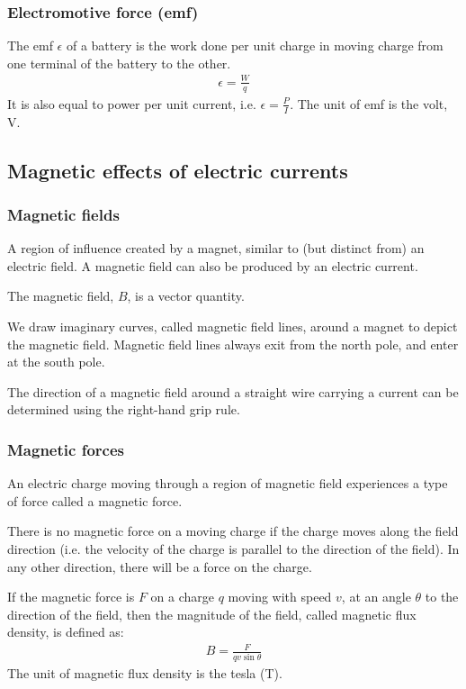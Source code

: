 \subsubsection{Electromotive force (emf)}
\begin{definition}
    The emf $\epsilon$ of a battery is the work done per unit charge in moving
    charge from one terminal of the battery to the other.
    \begin{align*}
        \epsilon = \frac{W}{q}
    \end{align*}
    It is also equal to power per unit current, i.e. $\epsilon = \frac{P}{I}$.
    The unit of emf is the volt, V.
\end{definition}

\subsection{Magnetic effects of electric currents}

\subsubsection{Magnetic fields}
A region of influence created by a magnet, similar to (but distinct from) an
electric field. A magnetic field can also be produced by an electric current.

The magnetic field, $B$, is a vector quantity.

We draw imaginary curves, called magnetic field lines, around a magnet to
depict the magnetic field. Magnetic field lines always exit from the north
pole, and enter at the south pole.

The direction of a magnetic field around a straight wire carrying a current
can be determined using the right-hand grip rule.

\subsubsection{Magnetic forces}
An electric charge moving through a region of magnetic field experiences a type
of force called a magnetic force.

There is no magnetic force on a moving charge if the charge moves along the
field direction (i.e. the velocity of the charge is parallel to the direction
of the field). In any other direction, there will be a force on the charge.

\begin{definition}
    If the magnetic force is $F$ on a charge $q$ moving with speed $v$, at an
    angle $\theta$ to the direction of the field, then the magnitude of the
    field, called magnetic flux density, is defined as:
    \begin{align*}
        B = \frac{F}{qv\sin\theta}
    \end{align*}
    The unit of magnetic flux density is the tesla (T).
\end{definition}

